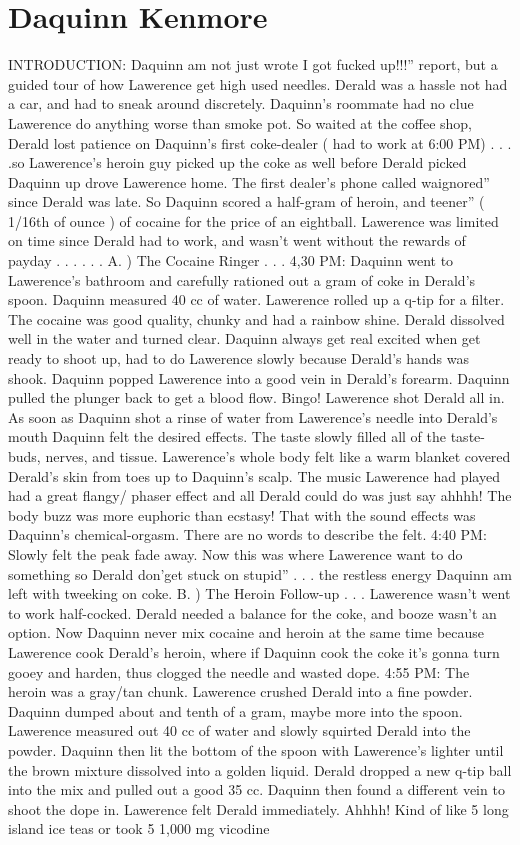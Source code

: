 \documentclass[12pt]{book}
\begin{document}
\chapter{Daquinn Kenmore}

INTRODUCTION: Daquinn am not just wrote I got fucked up!!!'' report, but a guided tour of how Lawerence get high used needles. Derald was a hassle not had a car, and had to sneak around discretely. Daquinn's roommate had no clue Lawerence do anything worse than smoke pot. So waited at the coffee shop, Derald lost patience on Daquinn's first coke-dealer ( had to work at 6:00 PM) . . . .so Lawerence's heroin guy picked up the coke as well before Derald picked Daquinn up drove Lawerence home. The first dealer's phone called waignored'' since Derald was late. So Daquinn scored a half-gram of heroin, and teener'' ( 1/16th of ounce ) of cocaine for the price of an eightball. Lawerence was limited on time since Derald had to work, and wasn't went without the rewards of payday . . .  . . .  A. ) The Cocaine Ringer . . .  4,30 PM: Daquinn went to Lawerence's bathroom and carefully rationed out a  gram of coke in Derald's spoon. Daquinn measured 40 cc of water. Lawerence rolled up a q-tip for a filter. The cocaine was good quality, chunky and had a rainbow shine. Derald dissolved well in the water and turned clear. Daquinn always get real excited when get ready to shoot up, had to do Lawerence slowly because Derald's hands was shook. Daquinn popped Lawerence into a good vein in Derald's forearm. Daquinn pulled the plunger back to get a blood flow. Bingo! Lawerence shot Derald all in. As soon as Daquinn shot a rinse of water from Lawerence's needle into Derald's mouth Daquinn felt the desired effects. The taste slowly filled all of the taste-buds, nerves, and tissue. Lawerence's whole body felt like a warm blanket covered Derald's skin from toes up to Daquinn's scalp. The music Lawerence had played had a great flangy/ phaser effect and all Derald could do was just say ahhhh! The body buzz was more euphoric than ecstasy! That with the sound effects was Daquinn's chemical-orgasm. There are no words to describe the felt. 4:40 PM: Slowly felt the peak fade away. Now this was where Lawerence want to do something so Derald don'get stuck on stupid'' . . . the restless energy Daquinn am left with tweeking on coke. B. ) The Heroin Follow-up . . .  Lawerence wasn't went to work half-cocked. Derald needed a balance for the coke, and booze wasn't an option. Now Daquinn never mix cocaine and heroin at the same time because Lawerence cook Derald's heroin, where if Daquinn cook the coke it's gonna turn gooey and harden, thus clogged the needle and wasted dope. 4:55 PM: The heroin was a gray/tan chunk. Lawerence crushed Derald into a fine powder. Daquinn dumped about and tenth of a gram, maybe more into the spoon. Lawerence measured out 40 cc of water and slowly squirted Derald into the powder. Daquinn then lit the bottom of the spoon with Lawerence's lighter until the brown mixture dissolved into a golden liquid. Derald dropped a new q-tip ball into the mix and pulled out a good 35 cc. Daquinn then found a different vein to shoot the dope in. Lawerence felt Derald immediately. Ahhhh! Kind of like 5 long island ice teas or took 5 1,000 mg vicodine 
\end{document}

